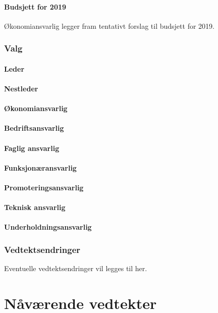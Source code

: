 \documentclass[10pt,norsk,a4paper]{article}
\begin{document}
\subsection{Budsjett for 2019}
Økonomiansvarlig legger fram tentativt forslag til budsjett for 2019.

\section{Valg}
\subsection{Leder}
\subsection{Nestleder}
\subsection{Økonomiansvarlig}
\subsection{Bedriftsansvarlig}
\subsection{Faglig ansvarlig}
\subsection{Funksjonæransvarlig}
\subsection{Promoteringsansvarlig}
\subsection{Teknisk ansvarlig}
\subsection{Underholdningsansvarlig}

\section{Vedtektsendringer}
Eventuelle vedtektsendringer vil legges til her.\label{lastpage}

\newpage
\part{Nåværende vedtekter}

\end{document}
